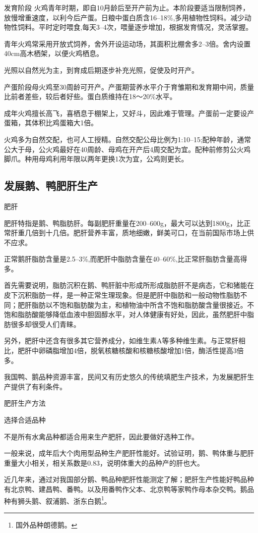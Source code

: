 \documentclass{ctexbook}
\begin{document}
发育阶段 火鸡青年时期，即自10月龄后至开产前为止。本阶段要适当限制饲养，放慢增重速度，以利今后产蛋。日粮中蛋白质含16--18\%,多用植物性饲料。减少动物性饲料。平时定时喂食,每天3--4次，喂量逐步增加，根据发育情况，灵活掌握。

青年火鸡常采用开放式饲养，舍外开设运动场，其面积比棚舍多2--3倍。舍内设置40cm高木栖架，以便火鸡栖息。

光照以自然光为主，到育成后期逐步补充光照，促使及时开产。

产蛋阶段母火鸡至30周龄可开产。产蛋期营养水平介于育雏期和发育期中间，质量比前者差些，较后者好些。蛋白质维持在18〜20\%水平。

成年火鸡擅长高飞，喜栖息于棚架上，又好斗，因此难于管理。产蛋前一定要设产蛋箱，其体积比鸡蛋箱大1倍。

火鸡多为自然交配，也可人工授精。自然交配公母比例为1:10--15;配种年龄，通常公大于母，公火鸡最好在40周龄、母鸡在开产后4周交配为宜。配种前修剪公火鸡脚爪。种用母鸡利用年限以两年更换1次为宜，公鸡则更长。
\subsection{发展鹅、鸭肥肝生产}
肥肝

肥肝特指是鹅、鸭脂肪肝。每副肥肝重量在200--600g，最大可以达到1800g，比正常肝重几倍到十几倍。肥肝营养丰富，质地细嫩，鲜美可口，在当前国际市场上供不应求。

正常鹅肝脂肪含量是2.5--3\%,而肥肝中脂肪含量在40--60\%,比正常肝脂肪含量高得多。

首先需要说明，脂肪沉积在鹅、鸭肝脏中形成所形成脂肪肝不是病态，它和猪能在皮下沉积脂肪一样，是一种正常生理现象。但是肥肝中脂肪和一般动物性脂肪不同；肥肝脂肪以不饱和脂肪酸为主，和植物油中所含不饱和脂肪酸含量很接近。不饱和脂肪酸能够降低血液中胆固醇水平，对人体健康有好处，因此，虽然肥肝中脂肪很多却很受人们青睐。

另外，肥肝中还含有很多其它营养成分，如维生素A等多种维生素。与正常肝相比，肥肝中卵磷脂增加4倍，脱氧核糖核酸和核糖核酸增加1倍，酶活性提高3倍多。

我国鸭、鹅品种资源丰富，民间又有历史悠久的传统填肥生产技术，为发展肥肝生产提供了有利条件。

肥肝生产方法

选择合适品种

不是所有水禽品种都适合用来生产肥肝，因此要做好选种工作。

一般来说，成年后大个肉用型品种生产肥肝性能好。试验证明，鹅、鸭体重与肥肝重量大小相关，相关系数是0.83，说明体重大的品种产的肝也大。

近几年来，通过对我国部分鹅、鸭品种肥肝性能测定了解；肥肝生产性能好鸭品种有北京鸭、建昌鸭、番鸭。以及用番鸭作父本、北京鸭等家鸭作母本杂交鸭。鹅品种有狮头鹅、叙浦鹅、浙东白鹅\footnote{国外品种朗德鹅。}。
\end{document}
